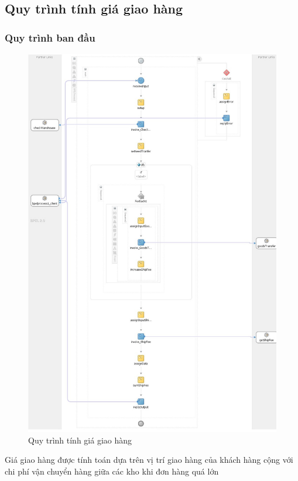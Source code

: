\newpage
\subsection{Quy trình tính giá giao hàng}
\subsubsection*{Quy trình ban đầu}
\begin{figure}[!htp]
    \centering
    \includegraphics[width=14cm]{img/bpel/getShipFee.jpg}
    \newline
    \caption{Quy trình tính giá giao hàng}
\end{figure}
Giá giao hàng được tính toán dựa trên vị trí giao hàng của khách hàng cộng với chi phí vận chuyển hàng giữa các kho khi đơn hàng quá lớn


